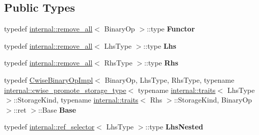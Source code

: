 \subsection*{Public Types}
\begin{DoxyCompactItemize}
\item 
\mbox{\label{class_eigen_1_1_cwise_binary_op_aecf8b37279ba824a914f6b2e8eeb1f0e}} 
typedef \mbox{\hyperlink{struct_eigen_1_1internal_1_1remove__all}{internal\+::remove\+\_\+all}}$<$ Binary\+Op $>$\+::type {\bfseries Functor}
\item 
\mbox{\label{class_eigen_1_1_cwise_binary_op_a31d9914c9d046a26f1d6104d7342c9d4}} 
typedef \mbox{\hyperlink{struct_eigen_1_1internal_1_1remove__all}{internal\+::remove\+\_\+all}}$<$ Lhs\+Type $>$\+::type {\bfseries Lhs}
\item 
\mbox{\label{class_eigen_1_1_cwise_binary_op_a06e93ecd10ac78c598a92a17aec6a1c2}} 
typedef \mbox{\hyperlink{struct_eigen_1_1internal_1_1remove__all}{internal\+::remove\+\_\+all}}$<$ Rhs\+Type $>$\+::type {\bfseries Rhs}
\item 
\mbox{\label{class_eigen_1_1_cwise_binary_op_aee1491a3491367912850a4cacc4d66b5}} 
typedef \mbox{\hyperlink{class_eigen_1_1_cwise_binary_op_impl}{Cwise\+Binary\+Op\+Impl}}$<$ Binary\+Op, Lhs\+Type, Rhs\+Type, typename \mbox{\hyperlink{struct_eigen_1_1internal_1_1cwise__promote__storage__type}{internal\+::cwise\+\_\+promote\+\_\+storage\+\_\+type}}$<$ typename \mbox{\hyperlink{struct_eigen_1_1internal_1_1traits}{internal\+::traits}}$<$ Lhs\+Type $>$\+::Storage\+Kind, typename \mbox{\hyperlink{struct_eigen_1_1internal_1_1traits}{internal\+::traits}}$<$ Rhs $>$\+::Storage\+Kind, Binary\+Op $>$\+::ret $>$\+::Base {\bfseries Base}
\item 
\mbox{\label{class_eigen_1_1_cwise_binary_op_a801ee06b0303d085c010328449d22ecf}} 
typedef \mbox{\hyperlink{struct_eigen_1_1internal_1_1ref__selector}{internal\+::ref\+\_\+selector}}$<$ Lhs\+Type $>$\+::type {\bfseries Lhs\+Nested}
\item 
\mbox{\label{class_eigen_1_1_cwise_binary_op_ab5da2bb07bf090d812f537c4286e8a3d}} 

\end{DoxyCompactItemize}
